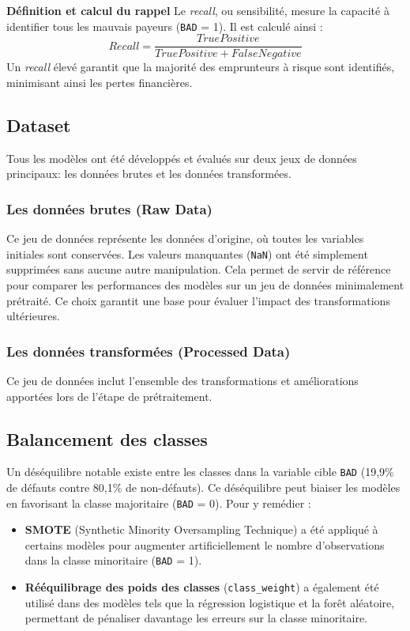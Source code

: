 \documentclass[a4paper,12pt]{report}
\begin{document}
\bigbreak
\textbf{Définition et calcul du rappel}
\smallbreak
Le \textit{recall}, ou sensibilité, mesure la capacité à identifier tous les mauvais payeurs (\texttt{BAD} = 1). Il est calculé ainsi :
\[Recall = \frac{True Positive}{True Positive + False Negative}\]
Un \textit{recall} élevé garantit que la majorité des emprunteurs à risque sont identifiés, minimisant ainsi les pertes financières.

\pagebreak
\subsection{Dataset}

Tous les modèles ont été développés et évalués sur deux jeux de données principaux: les données brutes et les données transformées.

\subsubsection{Les données brutes (Raw Data)}
Ce jeu de données représente les données d'origine, où toutes les variables initiales sont conservées. Les valeurs manquantes (\texttt{NaN}) ont été simplement supprimées sans aucune autre manipulation. Cela permet de servir de référence pour comparer les performances des modèles sur un jeu de données minimalement prétraité. Ce choix garantit une base pour évaluer l'impact des transformations ultérieures.

\subsubsection{Les données transformées (Processed Data)}
Ce jeu de données inclut l'ensemble des transformations et améliorations apportées lors de l'étape de prétraitement.

\subsection{Balancement des classes}

Un déséquilibre notable existe entre les classes dans la variable cible \texttt{BAD} (19,9\% de défauts contre 80,1\% de non-défauts). Ce déséquilibre peut biaiser les modèles en favorisant la classe majoritaire (\texttt{BAD} = 0). Pour y remédier :

\begin{itemize}
  \item \textbf{SMOTE} (Synthetic Minority Oversampling Technique) a été appliqué à certains modèles pour augmenter artificiellement le nombre d'observations dans la classe minoritaire (\texttt{BAD} = 1).
  \item \textbf{Rééquilibrage des poids des classes} (\texttt{class\_weight}) a également été utilisé dans des modèles tels que la régression logistique et la forêt aléatoire, permettant de pénaliser davantage les erreurs sur la classe minoritaire.
\end{itemize}
\end{document}

